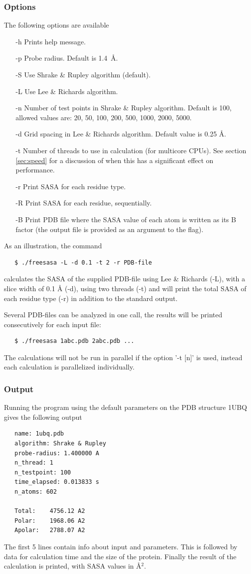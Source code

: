 \documentclass[a4paper,11pt]{article}
\begin{document}
\subsubsection{Options}
The following options are available
\begin{itemize}
  \item[-h] Prints help message.
  \item[-p] Probe radius. Default is 1.4~\AA.
  \item[-S] Use Shrake \& Rupley algorithm (default).
  \item[-L] Use Lee \& Richards algorithm.
  \item[-n] Number of test points in Shrake \& Rupley algorithm.
    Default is 100, allowed values are: 20, 50, 100, 200, 500, 1000,
    2000, 5000.
  \item[-d] Grid spacing in Lee \& Richards algorithm.
    Default value is 0.25 Å.
  \item[-t] Number of threads to use in calculation (for multicore
    CPUs). See section \ref{sec:speed} for a discussion of when this
    has a significant effect on performance.
  \item[-r] Print SASA for each residue type.
  \item[-R] Print SASA for each residue, sequentially.
  \item[-B] Print PDB file where the SASA value of each atom is
    written as its B factor (the output file is provided as an
    argument to the flag).
\end{itemize}
As an illustration, the command
\begin{verbatim}
   $ ./freesasa -L -d 0.1 -t 2 -r PDB-file
\end{verbatim}
calculates the SASA of the supplied PDB-file using Lee \& Richards
(-L), with a slice width of 0.1 Å (-d), using two
threads (-t) and will print the total SASA of each residue type
(-r) in addition to the standard output.

Several PDB-files can be analyzed in one call, the results will be
printed consecutively for each input file:
\begin{verbatim}
   $ ./freesasa 1abc.pdb 2abc.pdb ...
\end{verbatim}
The calculations will not be run in parallel if the option '-t [n]' is
used, instead each calculation is parallelized individually.

\subsubsection{Output}
Running the program using the default parameters on the PDB structure
1UBQ gives the following output
\begin{verbatim}
   name: 1ubq.pdb
   algorithm: Shrake & Rupley
   probe-radius: 1.400000 A
   n_thread: 1
   n_testpoint: 100
   time_elapsed: 0.013833 s
   n_atoms: 602
   
   Total:    4756.12 A2
   Polar:    1968.06 A2
   Apolar:   2788.07 A2
\end{verbatim}
The first 5 lines contain info about input and parameters. This is
followed by data for calculation time and the size of the
protein. Finally the result of the calculation is printed, with SASA
values in Å$^2$.
\end{document}
